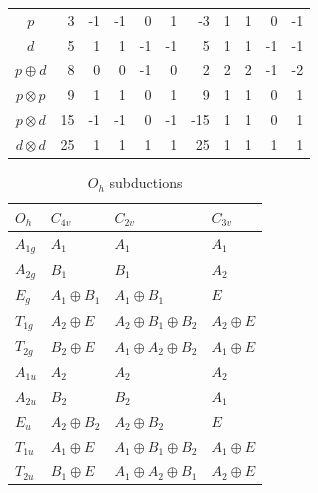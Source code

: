 \documentclass[twocolumn,showpacs,preprintnumbers,superscriptaddress,prb,floatfix,aps,10pt]{revtex4-1}
\begin{document}
\begin{table}
\begin{ruledtabular}
\begin{tabular*}{10cm}{llrrrrrrrrrr}
\multicolumn{2}{c}{$p$          } &  3  &     -1 &    -1  &     0  &     1  &  -3  &          1  &          1  &          0  &         -1  \\
\multicolumn{2}{c}{$d$          } &  5  &      1 &     1  &    -1  &    -1  &   5  &          1  &          1  &         -1  &         -1  \\
\multicolumn{2}{c}{$p \oplus  d$} &  8  &      0 &     0  &    -1  &     0  &   2  &          2  &          2  &         -1  &         -2  \\
\multicolumn{2}{c}{$p \otimes p$} &  9  &      1 &     1  &     0  &     1  &   9  &          1  &          1  &          0  &          1  \\
\multicolumn{2}{c}{$p \otimes d$} & 15  &     -1 &    -1  &     0  &    -1  & -15  &          1  &          1  &          0  &          1  \\
\multicolumn{2}{c}{$d \otimes d$} & 25  &      1 &     1  &     1  &     1  &  25  &          1  &          1  &          1  &          1  \\
\end{tabular*}
\end{ruledtabular}
\end{table}
%
\begin{table}
\caption{\label{table:subduction} $O_h$ subductions}
\begin{ruledtabular}
\begin{tabular*}{10cm}{llll}
$O_h$    & $C_{4v}$         & $C_{2v}$                              &   $C_{3v}$            \\ \hline
$A_{1g}$ & $A_1$            & $A_{1}$                               &   $A_1$               \\ 
$A_{2g}$ & $B_1$            & $B_{1}$                               &   $A_2$               \\ 
$E_g   $ & $A_1 \oplus B_1$ & $A_{1} \oplus B_{1}$                  &   $E$                 \\ 
$T_{1g}$ & $A_2 \oplus E$   & $A_{2} \oplus B_{1} \oplus B_{2}$     &   $A_2 \oplus E$      \\ 
$T_{2g}$ & $B_2 \oplus E$   & $A_{1} \oplus A_{2} \oplus B_{2}$     &   $A_1 \oplus E$      \\ 
$A_{1u}$ & $A_2$            & $A_{2}$                               &   $A_2$               \\ 
$A_{2u}$ & $B_2$            & $B_{2}$                               &   $A_1$               \\ 
$E_u   $ & $A_2 \oplus B_2$ & $A_{2} \oplus B_{2}$                  &   $E$                 \\ 
$T_{1u}$ & $A_1 \oplus E$   & $A_{1} \oplus B_{1} \oplus B_{2}$     &   $A_1 \oplus E$      \\ 
$T_{2u}$ & $B_1 \oplus E$   & $A_{1} \oplus A_{2} \oplus B_{1}$     &   $A_2 \oplus E$      \\ 
\end{tabular*}
\end{ruledtabular}
\end{table}
\end{document}
